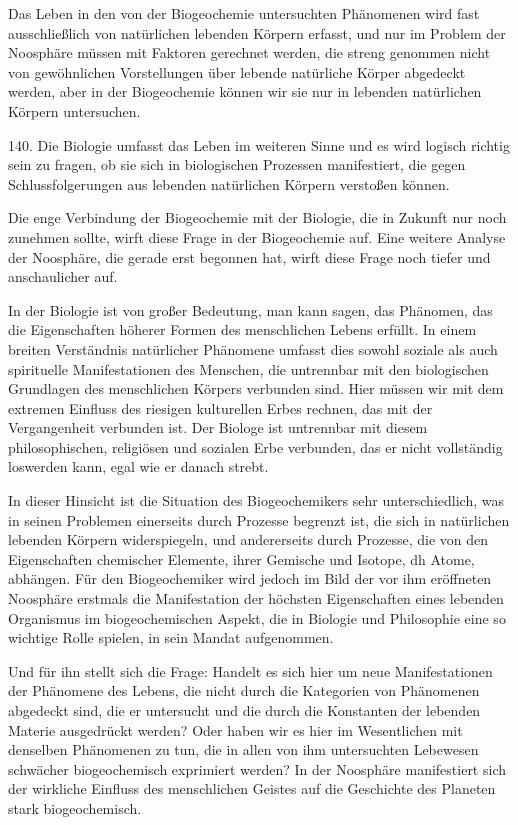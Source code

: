 \documentclass[11pt,a4paper]{book}
\begin{document}
Das Leben in den von der Biogeochemie untersuchten Phänomenen wird fast ausschließlich von natürlichen lebenden Körpern erfasst, und nur im Problem der Noosphäre müssen mit Faktoren gerechnet werden, die streng genommen nicht von gewöhnlichen Vorstellungen über lebende natürliche Körper abgedeckt werden, aber in der Biogeochemie können wir sie nur in lebenden natürlichen Körpern untersuchen.



140. Die Biologie umfasst das Leben im weiteren Sinne und es wird logisch richtig sein zu fragen, ob sie sich in biologischen Prozessen manifestiert, die gegen Schlussfolgerungen aus lebenden natürlichen Körpern verstoßen können.



Die enge Verbindung der Biogeochemie mit der Biologie, die in Zukunft nur noch zunehmen sollte, wirft diese Frage in der Biogeochemie auf. Eine weitere Analyse der Noosphäre, die gerade erst begonnen hat, wirft diese Frage noch tiefer und anschaulicher auf.



In der Biologie ist von großer Bedeutung, man kann sagen, das Phänomen, das die Eigenschaften höherer Formen des menschlichen Lebens erfüllt. In einem breiten Verständnis natürlicher Phänomene umfasst dies sowohl soziale als auch spirituelle Manifestationen des Menschen, die untrennbar mit den biologischen Grundlagen des menschlichen Körpers verbunden sind. Hier müssen wir mit dem extremen Einfluss des riesigen kulturellen Erbes rechnen, das mit der Vergangenheit verbunden ist. Der Biologe ist untrennbar mit diesem philosophischen, religiösen und sozialen Erbe verbunden, das er nicht vollständig loswerden kann, egal wie er danach strebt.



In dieser Hinsicht ist die Situation des Biogeochemikers sehr unterschiedlich, was in seinen Problemen einerseits durch Prozesse begrenzt ist, die sich in natürlichen lebenden Körpern widerspiegeln, und andererseits durch Prozesse, die von den Eigenschaften chemischer Elemente, ihrer Gemische und Isotope, dh Atome, abhängen. Für den Biogeochemiker wird jedoch im Bild der vor ihm eröffneten Noosphäre erstmals die Manifestation der höchsten Eigenschaften eines lebenden Organismus im biogeochemischen Aspekt, die in Biologie und Philosophie eine so wichtige Rolle spielen, in sein Mandat aufgenommen.



Und für ihn stellt sich die Frage: Handelt es sich hier um neue Manifestationen der Phänomene des Lebens, die nicht durch die Kategorien von Phänomenen abgedeckt sind, die er untersucht und die durch die Konstanten der lebenden Materie ausgedrückt werden? Oder haben wir es hier im Wesentlichen mit denselben Phänomenen zu tun, die in allen von ihm untersuchten Lebewesen schwächer biogeochemisch exprimiert werden? In der Noosphäre manifestiert sich der wirkliche Einfluss des menschlichen Geistes auf die Geschichte des Planeten stark biogeochemisch.
\end{document}
